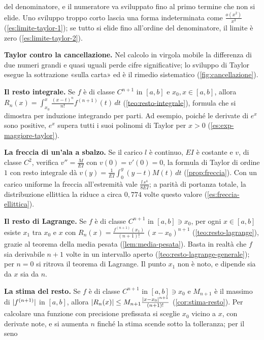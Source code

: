 \begin{puntichiave}
del denominatore, e il numeratore va sviluppato fino al primo termine che non si elide.
Uno sviluppo troppo corto lascia una forma indeterminata come $\frac{o(x^{2})}{x^{3}}$
(\cref{es:limite-taylor-1}); se tutto si elide fino all'ordine del denominatore, il
limite è zero (\cref{es:limite-taylor-2}).
\item \textbf{Taylor contro la cancellazione.} Nel calcolo in virgola mobile la
differenza di due numeri grandi e quasi uguali perde cifre significative; lo sviluppo di
Taylor esegue la sottrazione «sulla carta» ed è il rimedio sistematico
(\cref{fig:cancellazione}).
\item \textbf{Il resto integrale.} Se $f$ è di classe $C^{n+1}$ in $[a,b]$ e
$x_{0},x\in[a,b]$, allora $R_{n}(x)=\int_{x_{0}}^{x}\frac{(x-t)^{n}}{n!}f^{(n+1)}(t)\,dt$
(\cref{teo:resto-integrale}), formula che si dimostra per induzione integrando per parti.
Ad esempio, poiché le derivate di $e^{x}$ sono positive, $e^{x}$ supera tutti i suoi
polinomi di Taylor per $x>0$ (\cref{es:exp-maggiore-taylor}).
\item \textbf{La freccia di un'ala a sbalzo.} Se il carico $l$ è continuo, $EI$ è
costante e $v$, di classe $C^{2}$, verifica $v''=\frac M{EI}$ con $v(0)=v'(0)=0$, la
formula di Taylor di ordine $1$ con resto integrale dà
$v(y)=\frac1{EI}\int_{0}^{y}(y-t)M(t)\,dt$ (\cref{prop:freccia}). Con un carico uniforme la
freccia all'estremità vale $\frac{l\,s^{4}}{8EI}$; a parità di portanza totale, la
distribuzione ellittica la riduce a circa $0{,}774$ volte questo valore
(\cref{es:freccia-ellittica}).
\item \textbf{Il resto di Lagrange.} Se $f$ è di classe $C^{n+1}$ in $[a,b]\ni x_{0}$, per
ogni $x\in[a,b]$ esiste $x_{1}$ tra $x_{0}$ e $x$ con
$R_{n}(x)=\frac{f^{(n+1)}(x_{1})}{(n+1)!}\,{(x-x_{0})}^{n+1}$
(\cref{teo:resto-lagrange}), grazie al teorema della media pesata
(\cref{lem:media-pesata}). Basta in realtà che $f$ sia derivabile $n+1$ volte in un
intervallo aperto (\cref{teo:resto-lagrange-generale}); per $n=0$ si ritrova il teorema
di Lagrange. Il punto $x_{1}$ non è noto, e dipende sia da $x$ sia da $n$.
\item \textbf{La stima del resto.} Se $f$ è di classe $C^{n+1}$ in $[a,b]\ni x_{0}$ e
$M_{n+1}$ è il massimo di $\lvert f^{(n+1)}\rvert$ in $[a,b]$, allora
$\lvert R_{n}(x)\rvert\le M_{n+1}\frac{\lvert x-x_{0}\rvert^{n+1}}{(n+1)!}$ (\cref{cor:stima-resto}).
Per calcolare una funzione con precisione prefissata si sceglie $x_{0}$ vicino a $x$, con
derivate note, e si aumenta $n$ finché la stima scende sotto la tolleranza; per il seno

\end{puntichiave}
